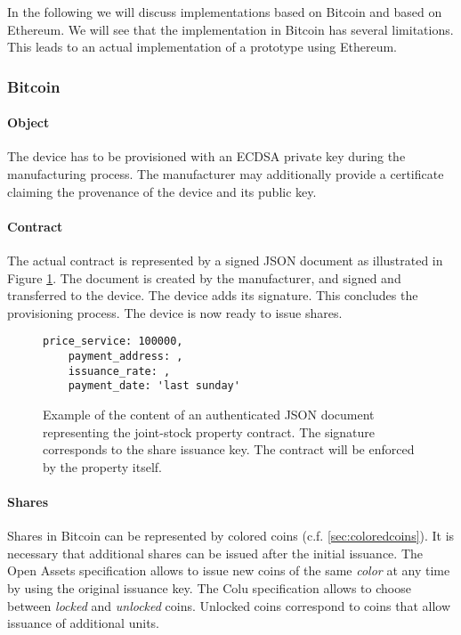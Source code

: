 In the following we will discuss implementations based on Bitcoin and based on Ethereum. We will see that the implementation in Bitcoin has several limitations. This leads to an actual implementation of a prototype using Ethereum.

\subsubsection{Bitcoin}

\paragraph{Object}

The device has to be provisioned with an ECDSA private key during the manufacturing process.
The manufacturer may additionally provide a certificate claiming the provenance of the device and its public key.

\paragraph{Contract}

The actual contract is represented by a signed JSON document as illustrated in Figure \ref{lst:contract}. The document is created by the manufacturer, and  signed and transferred to the device. The device adds its signature. This concludes the provisioning process. The device is now ready to issue shares.

\begin{figure}
\label{lst:contract}
\begin{lstlisting}[breaklines]
	price_service: 100000,
	payment_address: ,
	issuance_rate: ,
	payment_date: 'last sunday'
\end{lstlisting}
\caption{Example of the content of an authenticated JSON document representing the joint-stock property contract. The signature corresponds to the share issuance key. The contract will be enforced by the property itself.}
\end{figure}


\paragraph{Shares}

Shares in Bitcoin can be represented by colored coins (c.f. \ref{sec:coloredcoins}). It is necessary that additional shares can be issued after the initial issuance. The Open Assets specification allows to issue new coins of the same \emph{color} at any time by using the original issuance key. The Colu specification allows to choose between \emph{locked} and \emph{unlocked} coins. Unlocked coins correspond to coins that allow issuance of additional units.

